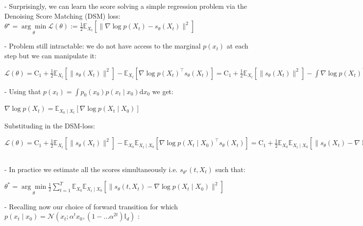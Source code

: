 - Surprisingly, we can learn the score solving a simple regression problem via the Denoising Score Matching (DSM) loss:
$\theta^{\star}=\underset{\theta}{\arg \min } \mathcal{L}(\theta):=\frac{1}{2} \mathbb{E}_{X_{t}}[\|\nabla \log p(X_{t})-s_{\theta}(X_{t})\|^2]$


- Problem still intractable: we do not have access to the marginal $p(x_{t})$ at each step but we can manipulate it:

$
\mathcal{L}(\theta) =\mathrm{C}_{1}+\frac{1}{2} \mathbb{E}_{X_{t}}[\|s_{\theta}(X_{t})\|^{2}]-\mathbb{E}_{X_{t}}[\nabla \log p(X_{t})^{\top} s_{\theta}(X_{t})]
=\mathrm{C}_{1}+\frac{1}{2} \mathbb{E}_{X_{t}}[\|s_{\theta}(X_{t})\|^{2}]-\int \nabla \log p(X_{t})^{\top} s_{\theta}(X_{t}) p(X_{t}) \mathrm{d} x_{t}
$



- Using that $p(x_{t})=\int p_{0}(x_{0}) p(x_{t} \mid x_{0}) \mathrm{d} x_{0}$ we get:

$
\nabla \log p(X_{t})=\mathbb{E}_{X_{0} \mid X_{t}}[\nabla \log p(X_{t} \mid X_{0})]
$

Substituding in the DSM-loss:

$
\mathcal{L}(\theta) =\mathrm{C}_{1}+\frac{1}{2} \mathbb{E}_{X_{t}}[\|s_{\theta}(X_{t})\|^{2}]-\mathbb{E}_{X_{0}} \mathbb{E}_{X_{t} \mid X_{0}}[\nabla \log p(X_{t} \mid X_{0})^{\top} s_{\theta}(X_{t})]
=\mathrm{C}_{1}+\frac{1}{2} \mathbb{E}_{X_{0}} \mathbb{E}_{X_{t} \mid X_{0}}[\|s_{\theta}(X_{t})-\nabla \log p(X_{t} \mid X_{0})\|^{2}]
-\frac{1}{2} \underbrace{\mathbb{E}_{X_{0}} \mathbb{E}_{X_{t} \mid X_{0}}[\|\nabla \log p(X_{t} \mid X_{0})\|^{2}]}_{\text {const. }}
=\mathrm{C}_{2}+\frac{1}{2} \mathbb{E}_{X_{0}} \mathbb{E}_{X_{t} \mid X_{0}}[\|s_{\theta}(X_{t})-\nabla \log p(X_{t} \mid X_{0})\|^{2}]
$

- In practice we estimate all the scores simultaneously i.e. $s_{\theta^{\star}}(t, X_{t})$ such that:

$\theta^* = \underset{\theta}{\arg\min} \frac{1}{2} \sum_{t=1}^{T} \mathbb{E}_{X_0} \mathbb{E}_{X_t \mid X_0}[\|s_\theta(t, X_t) - \nabla \log p(X_t \mid X_0)\|^2]$

- Recalling now our choice of forward transition for which $p(x_{t} \mid x_{0})=\mathcal{N}(x_{t} ; \alpha^{t} x_{0},(1-. ..\alpha^{2 t}) \mathbb{I}_{d})$ :

